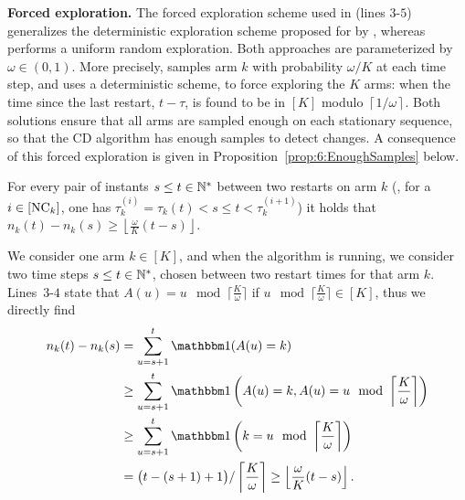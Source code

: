 \textbf{Forced exploration.}
%
The forced exploration scheme used in \GLRklUCB{} (lines $3$-$5$) generalizes the deterministic exploration scheme proposed for \MUCB{} by \cite{CaoZhenKvetonXie18}, whereas \CUSUMUCB{} performs a uniform random exploration.
Both approaches are parameterized by $\omega\in(0,1)$.
More precisely, \CUSUMUCB{} samples arm $k$ with probability $\omega/K$ at each time step,
and \MUCB{} uses a deterministic scheme, to force exploring the $K$ arms: when the time since the last restart, $t - \tau$, is found to be in $[K]$ modulo $\left\lceil 1/\omega \right\rceil$.
Both solutions ensure that all arms are sampled enough on each stationary sequence, so that the CD algorithm has enough \iid{} samples to detect changes.
%
A consequence of this forced exploration is given in Proposition~\ref{prop:6:EnoughSamples} below.

\begin{proposition}\label{prop:6:EnoughSamples}
\begin{leftbar}[propositionbar]  %
    For every pair of instants $s \leq t\in\mathbb{N}^*$ between two restarts on arm $k$ (\ie, for a $i\in[\text{NC}_k]$, one has $\tau_k^{(i)} = \tau_k(t) < s \leq t < \tau_k^{(i+1)}$) it holds that
    $n_k(t) - n_k(s) \geq \left\lfloor \frac{\omega}{K} (t-s) \right\rfloor$.
\end{leftbar}  %
\end{proposition}

\begin{smallproof}
    We consider one arm $k\in[K]$, and when the \GLRklUCB{} algorithm is running,
    we consider two time steps $s\leq t\in\mathbb{N}^*$, chosen between two restart times for that arm $k$.
    Lines~$3$-$4$ state that $A(u) = u \mod \lceil \frac{K}{\omega} \rceil$
    if $u \mod \lceil \frac{K}{\omega} \rceil \in [K]$,
    thus we directly find
    \begin{align*}
        n_k(t) - n_k(s)
        & = \sum_{u=s+1}^{t} \indic(A(u) = k) \\
        & \geq \sum_{u=s+1}^{t} \indic\left(A(u) = k, A(u) = u \mod \left\lceil \frac{K}{\omega} \right\rceil\right) \\
        & \geq \sum_{u=s+1}^{t} \indic\left(k = u \mod \left\lceil \frac{K}{\omega} \right\rceil\right) \\
        & = \bigl(t - (s+1) + 1\bigr) / \left\lceil \frac{K}{\omega} \right\rceil
        \geq \left\lfloor \frac{\omega}{K} (t - s) \right\rfloor.
    \end{align*}
\end{smallproof}


